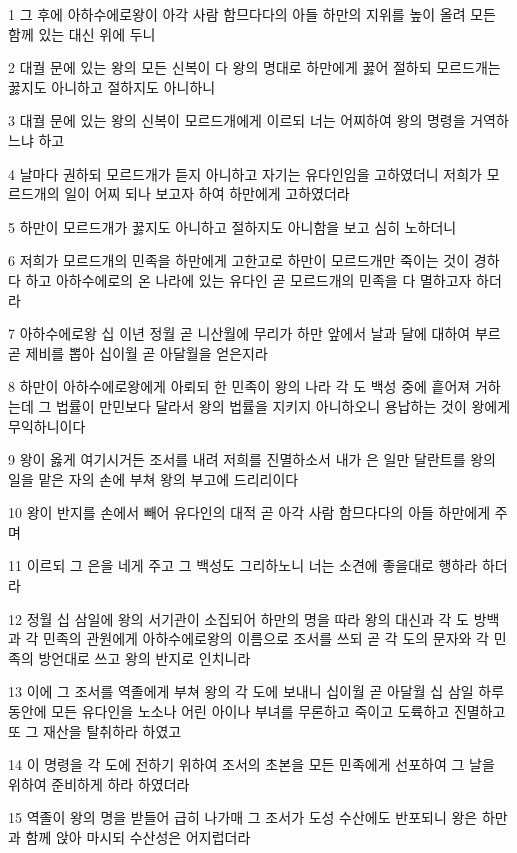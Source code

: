 \par 1 그 후에 아하수에로왕이 아각 사람 함므다다의 아들 하만의 지위를 높이 올려 모든 함께 있는 대신 위에 두니
\par 2 대궐 문에 있는 왕의 모든 신복이 다 왕의 명대로 하만에게 꿇어 절하되 모르드개는 꿇지도 아니하고 절하지도 아니하니
\par 3 대궐 문에 있는 왕의 신복이 모르드개에게 이르되 너는 어찌하여 왕의 명령을 거역하느냐 하고
\par 4 날마다 권하되 모르드개가 듣지 아니하고 자기는 유다인임을 고하였더니 저희가 모르드개의 일이 어찌 되나 보고자 하여 하만에게 고하였더라
\par 5 하만이 모르드개가 꿇지도 아니하고 절하지도 아니함을 보고 심히 노하더니
\par 6 저희가 모르드개의 민족을 하만에게 고한고로 하만이 모르드개만 죽이는 것이 경하다 하고 아하수에로의 온 나라에 있는 유다인 곧 모르드개의 민족을 다 멸하고자 하더라
\par 7 아하수에로왕 십 이년 정월 곧 니산월에 무리가 하만 앞에서 날과 달에 대하여 부르 곧 제비를 뽑아 십이월 곧 아달월을 얻은지라
\par 8 하만이 아하수에로왕에게 아뢰되 한 민족이 왕의 나라 각 도 백성 중에 흩어져 거하는데 그 법률이 만민보다 달라서 왕의 법률을 지키지 아니하오니 용납하는 것이 왕에게 무익하니이다
\par 9 왕이 옳게 여기시거든 조서를 내려 저희를 진멸하소서 내가 은 일만 달란트를 왕의 일을 맡은 자의 손에 부쳐 왕의 부고에 드리리이다
\par 10 왕이 반지를 손에서 빼어 유다인의 대적 곧 아각 사람 함므다다의 아들 하만에게 주며
\par 11 이르되 그 은을 네게 주고 그 백성도 그리하노니 너는 소견에 좋을대로 행하라 하더라
\par 12 정월 십 삼일에 왕의 서기관이 소집되어 하만의 명을 따라 왕의 대신과 각 도 방백과 각 민족의 관원에게 아하수에로왕의 이름으로 조서를 쓰되 곧 각 도의 문자와 각 민족의 방언대로 쓰고 왕의 반지로 인치니라
\par 13 이에 그 조서를 역졸에게 부쳐 왕의 각 도에 보내니 십이월 곧 아달월 십 삼일 하루 동안에 모든 유다인을 노소나 어린 아이나 부녀를 무론하고 죽이고 도륙하고 진멸하고 또 그 재산을 탈취하라 하였고
\par 14 이 명령을 각 도에 전하기 위하여 조서의 초본을 모든 민족에게 선포하여 그 날을 위하여 준비하게 하라 하였더라
\par 15 역졸이 왕의 명을 받들어 급히 나가매 그 조서가 도성 수산에도 반포되니 왕은 하만과 함께 앉아 마시되 수산성은 어지럽더라

